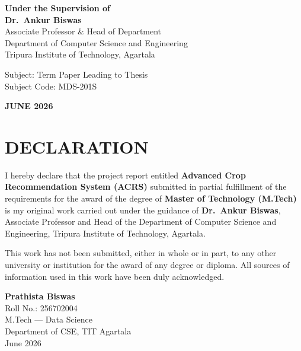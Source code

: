 \documentclass[12pt,a4paper,oneside]{report}
\begin{document}
\begin{titlepage}
{\textbf{Under the Supervision of}\\[3pt]
\textbf{Dr.\ Ankur Biswas}\\[3pt]
Associate Professor \& Head of Department\\[3pt]
Department of Computer Science and Engineering\\[3pt]
Tripura Institute of Technology, Agartala\par}
\vspace{0.35cm}
{\fontsize{12}{16}\selectfont
Subject: Term Paper Leading to Thesis\\[3pt]
Subject Code: MDS-201S\par}
\vspace{0.35cm}
{\fontsize{12}{16}\selectfont\bfseries JUNE 2026\par}
\end{titlepage}

\chapter*{DECLARATION}

\begin{singlespacing}
I hereby declare that the project report entitled \textbf{Advanced Crop Recommendation System (ACRS)} submitted in partial fulfillment of the requirements for the award of the degree of \textbf{Master of Technology (M.Tech)} is my original work carried out under the guidance of \textbf{Dr.\ Ankur Biswas}, Associate Professor and Head of the Department of Computer Science and Engineering, Tripura Institute of Technology, Agartala.

\vspace{0.4cm}
This work has not been submitted, either in whole or in part, to any other university or institution for the award of any degree or diploma. All sources of information used in this work have been duly acknowledged.

\vspace{1.2cm}
\noindent\textbf{Prathista Biswas}\\
Roll No.: 256702004\\
M.Tech --- Data Science\\
Department of CSE, TIT Agartala\\
June 2026
\end{singlespacing}
\newpage
\end{document}
